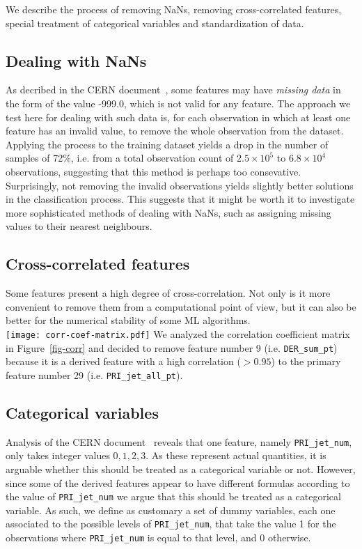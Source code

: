 We describe the process of removing NaNs, removing cross-correlated features, special treatment of categorical variables and standardization of data.

\subsection{Dealing with NaNs}
As decribed in the CERN document~\cite{cern-doc}, some features may have \emph{missing data} in the form of the value -999.0, which is not valid for any feature.
The approach we test here for dealing with such data is, for each observation in which at least one feature has an invalid value, to remove the whole observation from the dataset.
Applying the process to the training dataset yields a drop in the number of samples of 72\%, i.e. from a total observation count of $2.5 \times 10^5$ to $6.8 \times 10^4$ observations, suggesting that this method is perhaps too consevative.
Surprisingly, not removing the invalid observations yields slightly better solutions in the classification process.
This suggests that it might be worth it to investigate more sophisticated methods of dealing with NaNs, such as assigning missing values to their nearest neighbours.

\subsection{Cross-correlated features}
Some features present a high degree of cross-correlation.
Not only is it more convenient to remove them from a computational point of view, but it can also be better for the numerical stability of some ML algorithms.  \\
\texttt{[image: corr-coef-matrix.pdf]}
We analyzed the correlation coefficient matrix in Figure~\ref{fig-corr} and decided to remove feature number 9 (i.e. \texttt{DER\_sum\_pt}) because it is a derived feature with a high correlation ($> 0.95$) to the primary feature number 29 (i.e. \texttt{PRI\_jet\_all\_pt}).

\subsection{Categorical variables}
Analysis of the CERN document~\cite{cern-doc} reveals that one feature, namely \texttt{PRI\_jet\_num}, only takes integer values $0,1,2,3$.
As these represent actual quantities, it is arguable whether this should be treated as a categorical variable or not.
However, since some of the derived features appear to have different formulas according to the value of \texttt{PRI\_jet\_num} we argue that this should be treated as a categorical variable.
As such, we define as customary a set of dummy variables, each one associated to the possible levels of \texttt{PRI\_jet\_num}, that take the value 1 for the observations where \texttt{PRI\_jet\_num} is equal to that level, and 0 otherwise.

